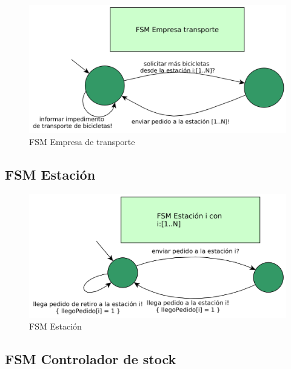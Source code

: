 \begin{figure}[H]
	\centering
	\includegraphics[scale=0.4]{imgs/fsm_empresa_transporte.png}
	\caption{FSM Empresa de transporte}
\end{figure}

\subsection{FSM Estaci\'on}

\begin{figure}[H]
	\centering
	\includegraphics[scale=0.5]{imgs/fsm_estacion.png}
	\caption{FSM Estaci\'on}
\end{figure}

\subsection{FSM Controlador de stock}

